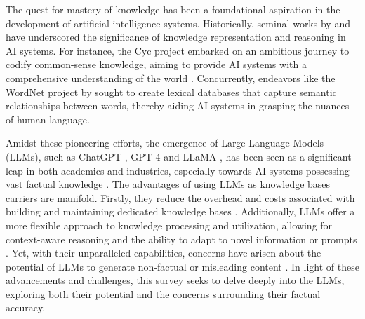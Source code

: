 The quest for mastery of knowledge has been a foundational aspiration in the development of artificial intelligence systems. Historically, seminal works by \citet{McCarthy1963} and \citet{Newell1976} have underscored the significance of knowledge representation and reasoning in AI systems. For instance, the Cyc project embarked on an ambitious journey to codify common-sense knowledge, aiming to provide AI systems with a comprehensive understanding of the world \citep{Lenat1995}. Concurrently, endeavors like the WordNet project by \citet{Miller1990} sought to create lexical databases that capture semantic relationships between words, thereby aiding AI systems in grasping the nuances of human language. 

Amidst these pioneering efforts, the emergence of Large Language Models (LLMs), such as ChatGPT \citep{chatgpt}, GPT-4 \citep{GPT4} and LLaMA \citep{llama,llama2}, has been seen as a significant leap in both academics and industries, especially towards AI systems possessing vast factual knowledge \citep{LAMA,de-cao-etal-2021-editing,GPT4}. 
The advantages of using LLMs as knowledge bases carriers are manifold. Firstly, they reduce the overhead and costs associated with building and maintaining dedicated knowledge bases \citep{petroni2019language,alkhamissi2022review,KSSM}. Additionally, LLMs offer a more flexible approach to knowledge processing and utilization, allowing for context-aware reasoning and the ability to adapt to novel information or prompts \citep{sun2023beamsearchqa,huang2023reasoning}. 
Yet, with their unparalleled capabilities, concerns have arisen about the potential of LLMs to generate non-factual or misleading content \citep{Bender2021,GPT4,bubeck2023sparks}. In light of these advancements and challenges, this survey seeks to delve deeply into the LLMs, exploring both their potential and the concerns surrounding their factual accuracy.

